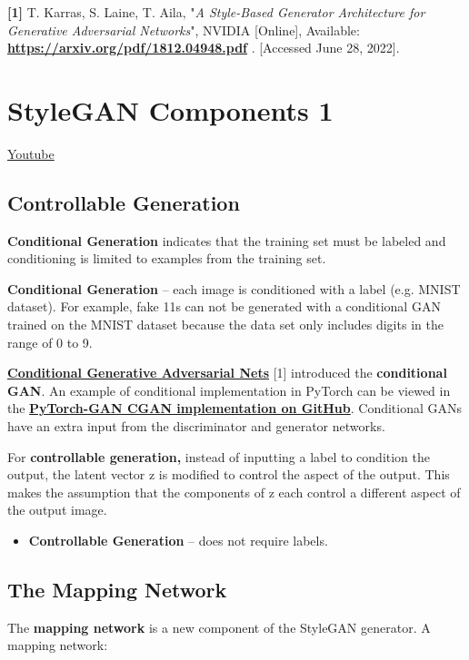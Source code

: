 \textbf{[1]} T. Karras, S. Laine, T. Aila, "\textit{A Style-Based Generator Architecture for Generative Adversarial Networks}", NVIDIA [Online], Available: \href{https://arxiv.org/pdf/1812.04948.pdf}{\textbf{https://arxiv.org/pdf/1812.04948.pdf}} . [Accessed June 28, 2022].

\section{StyleGAN Components 1}
\href{https://www.youtube.com/watch?v=FgWMN-FMdjU}{Youtube}

\subsection{Controllable Generation}
\textbf{Conditional Generation} indicates that the training set must be labeled and conditioning is limited to examples from the training set. \newline

\textbf{Conditional Generation} – each image is conditioned with a label (e.g. MNIST dataset).
For example, fake 11s can not be generated with a conditional GAN trained on the MNIST dataset because the data set only includes digits in the range of 0 to 9. \newline

\href{https://arxiv.org/pdf/1411.1784.pdf}{\textbf{Conditional Generative Adversarial Nets}} [1] introduced the \textbf{conditional GAN}. An example of conditional implementation in PyTorch can be viewed in the \href{https://github.com/eriklindernoren/PyTorch-GAN/blob/36d3c77e5ff20ebe0aeefd322326a134a279b93e/implementations/cgan/cgan.py}{\textbf{PyTorch-GAN CGAN implementation on GitHub}}. Conditional GANs have an extra input from the discriminator and generator networks. \newline

For \textbf{controllable generation,} instead of inputting a label to condition the output, the latent vector z is modified to control the aspect of the output. This makes the assumption that the components of z each control a different aspect of the output image. 

\begin{itemize}
    \item \textbf{Controllable Generation} – does not require labels.
\end{itemize}

\subsection{The Mapping Network}
The \textbf{mapping network} is a new component of the StyleGAN generator. A mapping network:

